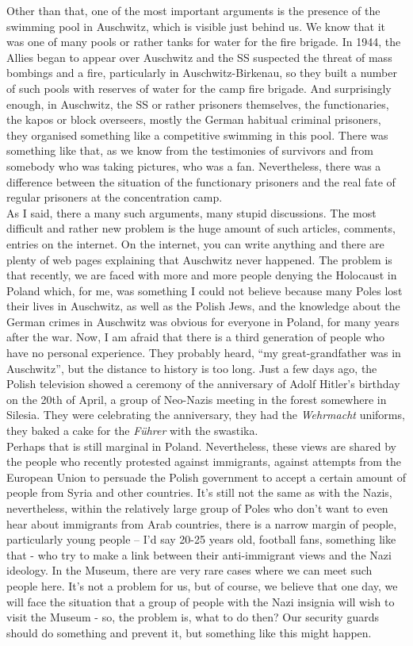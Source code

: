 Other than that, one of the most important arguments is the presence of the swimming pool in Auschwitz, which is visible just behind us. We know that it was one of many pools or rather tanks for water for the fire brigade. In 1944, the Allies began to appear over Auschwitz and the SS suspected the threat of mass bombings and a fire, particularly in Auschwitz-Birkenau, so they built a number of such pools with reserves of water for the camp fire brigade. And surprisingly enough, in Auschwitz, the SS or rather prisoners themselves, the functionaries, the kapos or block overseers, mostly the German habitual criminal prisoners, they organised something like a competitive swimming in this pool. There was something like that, as we know from the testimonies of survivors and from somebody who was taking pictures, who was a fan. Nevertheless, there was a difference between the situation of the functionary prisoners and the real fate of regular prisoners at the concentration camp. \\
As I said, there a many such arguments, many stupid discussions. The most difficult and rather new problem is the huge amount of such articles, comments, entries on the internet. On the internet, you can write anything and there are plenty of web pages explaining that Auschwitz never happened. The problem is that recently, we are faced with more and more people denying the Holocaust in Poland which, for me, was something I could not believe because many Poles lost their lives in Auschwitz, as well as the Polish Jews, and the knowledge about the German crimes in Auschwitz was obvious for everyone in Poland, for many years after the war. Now, I am afraid that there is a third generation of people who have no personal experience. They probably heard, ``my great-grandfather was in Auschwitz'', but the distance to history is too long. Just a few days ago, the Polish television showed a ceremony of the anniversary of Adolf Hitler's birthday on the 20th of April, a group of Neo-Nazis meeting in the forest somewhere in Silesia. They were celebrating the anniversary, they had the \textit{Wehrmacht} uniforms, they baked a cake for the \textit{Führer} with the swastika.\\ 
Perhaps that is still marginal in Poland. Nevertheless, these views are shared by the people who recently protested against immigrants, against attempts from the European Union to persuade the Polish government to accept a certain amount of people from Syria and other countries. It's still not the same as with the Nazis, nevertheless, within the relatively large group of Poles who don't want to even hear about immigrants from Arab countries, there is a narrow margin of people, particularly young people – I’d say 20-25 years old, football fans, something like that - who try to make a link between their anti-immigrant views and the Nazi ideology. In the Museum, there are very rare cases where we can meet such people here. It's not a problem for us, but of course, we believe that one day, we will face the situation that a group of people with the Nazi insignia will wish to visit the Museum - so, the problem is, what to do then? Our security guards should do something and prevent it, but something like this might happen.\\
